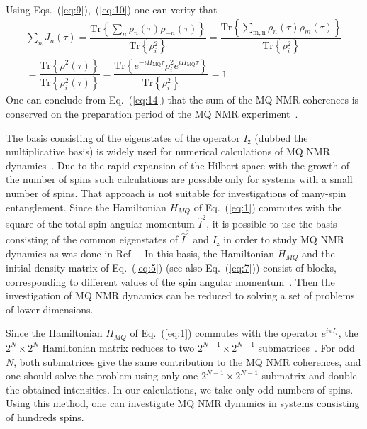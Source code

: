 \documentclass[review]{elsarticle}
\begin{document}
%
Using Eqs.~(\ref{eq:9}),~(\ref{eq:10}) one can verity that 
%
\begin{multline}
    \label{eq:14}
    \sum\limits_{n} J_{n}(\tau)
    = \dfrac{
        \mathrm{Tr} \left\{
            \sum_{n} \rho_{n}(\tau) \rho_{-n}(\tau)
        \right\}}
    {\mathrm{Tr} \left\{ \rho^2_{i} \right\}} 
    = \dfrac{
        \mathrm{Tr} \left\{
            \sum_{\mathrm{m,n}} \rho_n(\tau)\rho_m(\tau)
    \right\}}
    {\mathrm{Tr} \left\{\rho^2_{i}\right\}}
    \\
    = \dfrac{
        \mathrm{Tr}\left\{\rho^2(\tau)\right\}
    }
    {
        \mathrm{Tr}\left\{\rho^2_{i}(\tau)\right\}
    }
    = \dfrac{
        \mathrm{Tr} \left\{ 
            e^{-i H_\mathrm{MQ} \tau} 
            \rho^{2}_{i}
            e^{i H_\mathrm{MQ} \tau} 
        \right\}
    }
    {
        \mathrm{Tr} \left\{ \rho_{i}^{2} \right\}
    } 
    = 1
\end{multline}
%
One can conclude from Eq.~(\ref{eq:14}) that the sum of the MQ NMR coherences is conserved on the preparation period of the MQ NMR experiment~\cite{Baum_1985}.

The basis consisting of the eigenstates of the operator $I_\mathrm{z}$ (dubbed the multiplicative basis) is widely used for numerical calculations of MQ NMR dynamics~\cite{Zhang_2009}.
Due to the rapid expansion of the Hilbert space with the growth of the number of spins such calculations are possible only for systems with a small number of spins.
That approach is not suitable for investigations of many-spin entanglement.
Since the Hamiltonian $H_{MQ}$ of Eq.~(\ref{eq:1}) commutes with the square of the total spin angular momentum $\hat I^2$, 
it is possible to use the basis consisting of the common eigenstates of $\hat I^2$ and $I_\mathrm{z}$ in order to study MQ NMR dynamics as was done in Ref.~\cite{Doronin_2009,Doronin_2011,Doronin_2019}.
In this basis, the Hamiltonian $H_{MQ}$ and the initial density matrix of Eq.~(\ref{eq:5}) (see also Eq.~(\ref{eq:7})) consist of blocks, corresponding to different values of the spin angular momentum~\cite{Doronin_2009}.
Then the investigation of MQ NMR dynamics can be reduced to solving a set of problems of lower dimensions.

Since the Hamiltonian $H_{MQ}$ of Eq.~(\ref{eq:1}) commutes with the operator $e^{i\pi I_\mathrm{z}}$, the $2^N \times 2^N$ Hamiltonian matrix reduces to two $2^{N-1} \times 2^{N-1}$ submatrices~\cite{Doronin_2009}.
For odd $N$, both submatrices give the same contribution to the MQ NMR coherences, and one should solve the problem using only one $2^{N-1} \times 2^{N-1}$ submatrix and double the obtained intensities. 
In our calculations, we take only odd numbers of spins.
Using this method, one can investigate MQ NMR dynamics in systems consisting of hundreds spins.
\end{document}
